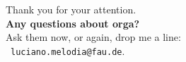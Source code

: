 \documentclass[aspectratio=169,t]{beamer}
\begin{document}
  { %
    \begin{frame}[c]
      \begin{center}
        Thank you for your attention.\\
        {\bf Any questions about orga?}\\[0.5cm]
        Ask them now, or again, drop me a line: \\ 
        \faSendO \ \texttt{luciano.melodia@fau.de}.
      \end{center}
    \end{frame}
  }
\end{document}
